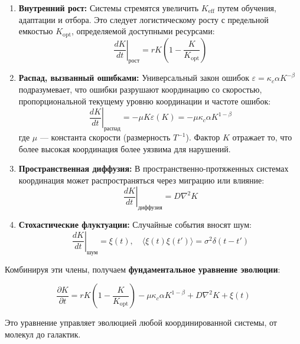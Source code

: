 \documentclass[12pt,a4paper]{article}
\theoremstyle{remark}
\newcommand{\Keff}{K_{\mathrm{eff}}}
\newcommand{\Keffopt}{K_{\mathrm{opt}}}
\newcommand{\kappac}{\kappa_c}
\newcommand{\eps}{\varepsilon}
\begin{document}
	\begin{enumerate}
		\item \textbf{Внутренний рост:} Системы стремятся увеличить $\Keff$ путем обучения, адаптации и отбора. Это следует логистическому росту с предельной емкостью $\Keffopt$, определяемой доступными ресурсами:
		\begin{equation}
			\left.\frac{dK}{dt}\right|_{\text{рост}} = r K \left(1 - \frac{K}{\Keffopt}\right)
			\label{eq:growth}
		\end{equation}
		
		\item \textbf{Распад, вызванный ошибками:} Универсальный закон ошибок $\eps = \kappac \alpha K^{-\beta}$ подразумевает, что ошибки разрушают координацию со скоростью, пропорциональной текущему уровню координации и частоте ошибок:
		\begin{equation}
			\left.\frac{dK}{dt}\right|_{\text{распад}} = -\mu K \eps(K) = -\mu \kappac \alpha K^{1-\beta}
			\label{eq:decay}
		\end{equation}
		где $\mu$ — константа скорости (размерность $T^{-1}$). Фактор $K$ отражает то, что более высокая координация более уязвима для нарушений.
		
		\item \textbf{Пространственная диффузия:} В пространственно-протяженных системах координация может распространяться через миграцию или влияние:
		\begin{equation}
			\left.\frac{dK}{dt}\right|_{\text{диффузия}} = D \nabla^2 K
			\label{eq:diffusion}
		\end{equation}
		
		\item \textbf{Стохастические флуктуации:} Случайные события вносят шум:
		\begin{equation}
			\left.\frac{dK}{dt}\right|_{\text{шум}} = \xi(t), \quad \langle \xi(t)\xi(t')\rangle = \sigma^2 \delta(t-t')
			\label{eq:noise}
		\end{equation}
	\end{enumerate}
	
	Комбинируя эти члены, получаем \textbf{фундаментальное уравнение эволюции}:
	
	\begin{equation}
		\boxed{\frac{\partial K}{\partial t} = r K \left(1 - \frac{K}{\Keffopt}\right) - \mu \kappac \alpha K^{1-\beta} + D \nabla^2 K + \xi(t)}
		\label{eq:evolution}
	\end{equation}
	
	Это уравнение управляет эволюцией любой координированной системы, от молекул до галактик.
	
\end{document}
